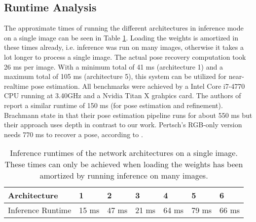 \subsection{Runtime Analysis}

The approximate times of running the different architectures in inference mode on a single image can be seen in Table \ref{table:network_runtimes}. Loading the weights is amortized in these times already, i.e. inference was run on many images, otherwise it takes a lot longer to process a single image. The actual pose recovery computation took 26 ms per image. With a minimum total of 41 ms (architecture 1) and a maximum total of 105 ms (architecture 5), this system can be utilized for near-realtime pose estimation. All benchmarks were achieved by a Intel Core i7-4770 CPU running at 3.40GHz and a Nvidia Titan X grahpics card. The authors of \cite{bb8} report a similar runtime of 150 ms (for pose estimation and refinement). Brachmann \etal state in \cite{brachmann1} that their pose estimation pipeline runs for about 550 ms but their approach uses depth in contrast to our work. Pertsch's RGB-only version needs 770 ms to recover a pose, according to \cite{pertsch}.

\begin{table}[b]
\centering
\begin{tabular}{|l||llllll|}
\hline
Architecture      & 1     & 2     & 3     & 4     & 5     & 6     \\ \hline \hline \rowcolor{Gray}
Inference Runtime & 15 ms & 47 ms & 21 ms & 64 ms & 79 ms & 66 ms \\  \hline  
\end{tabular}
\caption{Inference runtimes of the network architectures on a single image. These times can only be achieved when loading the weights has been amortized by running inference on many images.}
\label{table:network_runtimes}
\end{table}